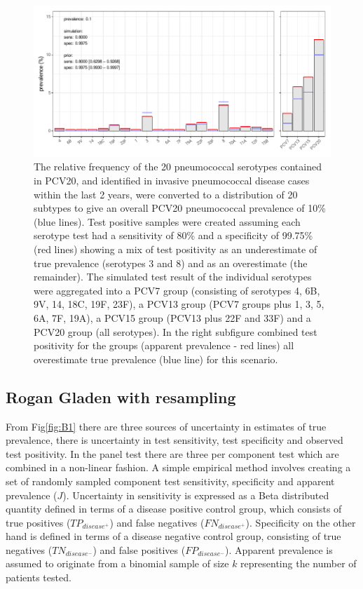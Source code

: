 \documentclass[a4paper, 12pt, twoside]{article}
\let\Oldsubsection\subsection
\renewcommand{\subsection}{\FloatBarrier\Oldsubsection}
\begin{document}
\begin{figure}[h!]
\centering
  \includegraphics{fig/simulation_setup_prev_10}
  \caption{The relative frequency of the 20 pneumococcal serotypes contained in PCV20, and identified in invasive pneumococcal disease cases within the last 2 years, were converted to a distribution of 20 subtypes to give an overall PCV20 pneumococcal prevalence of 10\% (blue lines). Test positive samples were created assuming each serotype test had a sensitivity of 80\% and a specificity of 99.75\% (red lines) showing a mix of test positivity as an underestimate of true prevalence (serotypes 3 and 8) and as an overestimate (the remainder). The simulated test result of the individual serotypes were aggregated into a PCV7 group (consisting of serotypes 4, 6B, 9V, 14, 18C, 19F, 23F), a PCV13 group (PCV7 groups plus 1, 3, 5, 6A, 7F, 19A), a PCV15 group (PCV13 plus 22F and 33F) and a PCV20 group (all serotypes). In the right subfigure combined test positivity for the groups (apparent prevalence - red lines) all overestimate true prevalence (blue line) for this scenario.}
\label{fig:B2}
\end{figure}

\subsection{Rogan Gladen with resampling}

From Fig\ref{fig:B1} there are three sources of uncertainty in estimates of true prevalence, there is uncertainty in test sensitivity, test specificity and observed test positivity. In the panel test there are three per component test which are combined in a non-linear fashion. A simple empirical method involves creating a set of randomly sampled component test sensitivity, specificity and apparent prevalence (\(J\)). Uncertainty in sensitivity is expressed as a Beta distributed quantity defined in terms of a disease positive control group, which consists of true positives (\(TP_{disease^+}\)) and false negatives (\(FN_{disease^+}\)). Specificity on the other hand is defined in terms of a disease negative control group, consisting of true negatives (\(TN_{disease^-}\)) and false positives (\(FP_{disease^-}\)). Apparent prevalence is assumed to originate from a binomial sample of size \(k\) representing the number of patients tested.
\end{document}
